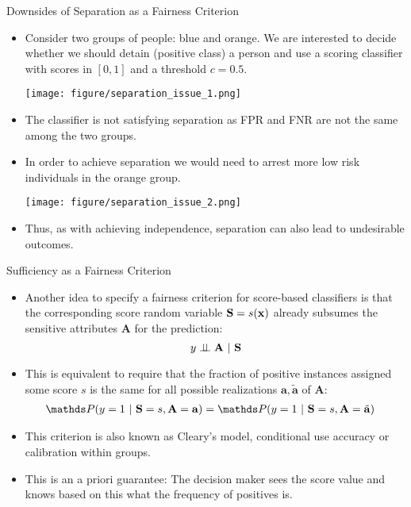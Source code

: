 \documentclass[11pt,compress,t,notes=noshow, xcolor=table]{beamer}
\newcommand{\sens}{\mathbf{A}} %
\newcommand{\ba}{\mathbf{a}}
\newcommand{\batilde}{\tilde{\mathbf{a}}}
\begin{document}
\begin{vbframe}{Downsides of Separation as a Fairness Criterion}
	\small{
		\begin{itemize}
			\item Consider two groups of people: blue and orange. We are interested to decide whether we should detain (positive class) a person and use a scoring classifier with scores in $[0,1]$ and a threshold $c=0.5.$
			
			\begin{center}
					\texttt{[image: figure/separation\_issue\_1.png]}
			\end{center}  
			\item The classifier is not satisfying separation as FPR and FNR are not the same among the two groups.
			\framebreak
%			
			\item In order to achieve separation we would need to arrest more low risk individuals in the orange group.
			\begin{center}
				\texttt{[image: figure/separation\_issue\_2.png]}
			\end{center}
			\item Thus, as with achieving independence, separation can also lead to undesirable outcomes.
%			
		\end{itemize}
	}
\end{vbframe}


\begin{vbframe}{Sufficiency as a Fairness Criterion}
	\small{
		\begin{itemize}
			\item Another idea to specify a fairness criterion for score-based classifiers is that the corresponding score random variable $\mathbf{S} = s(\mathbf{x})$ already subsumes the sensitive attributes $\sens$ for the prediction: 
			$$	y \indep \sens ~|~ 	\mathbf{S}$$
%			
			\item This is equivalent to require that the fraction of positive instances assigned some score $s$ is the same for   all possible realizations $\ba,\batilde$ of $\sens:$
			\begin{align*}
				&\P(  y = 1 ~|~ \mathbf{S} = s, \sens = \ba ) = \P(  y = 1 ~|~  \mathbf{S} = s, \sens = \batilde ) 
			\end{align*}
			\item This criterion is also known as Cleary's model, conditional use accuracy or calibration within groups.
			\item This is an a priori guarantee: The decision maker sees the score value and knows based on this what the frequency of positives is.
		\end{itemize}
	}
\end{vbframe}
\end{document}
